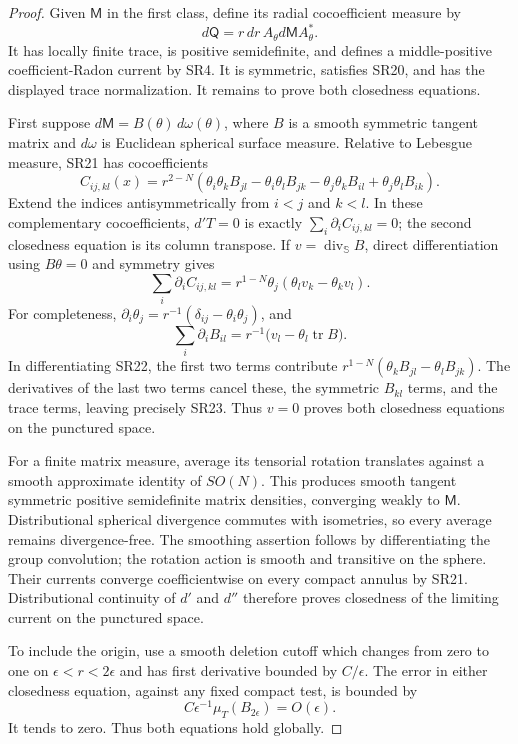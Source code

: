 \begin{proof}
Given $\mathsf M$ in the first class, define its radial
cocoefficient measure by
\[
           d\mathsf Q=r\,dr\,A_\theta d\mathsf M A_\theta^*.
 \tag{SR21}
\]
It has locally finite trace, is positive semidefinite,
and defines a middle-positive coefficient-Radon current
by SR4.  It is symmetric, satisfies SR20, and has the
displayed trace normalization.  It remains to prove both
closedness equations.

First suppose $d\mathsf M=B(\theta)\,d\omega(\theta)$,
where $B$ is a smooth symmetric tangent matrix and $d\omega$
is Euclidean spherical surface measure.  Relative to
Lebesgue measure, SR21 has cocoefficients
\[
 C_{ij,kl}(x)=r^{2-N}
  (\theta_i\theta_kB_{jl}-\theta_i\theta_lB_{jk}
          -\theta_j\theta_kB_{il}+\theta_j\theta_lB_{ik}).
 \tag{SR22}
\]
Extend the indices antisymmetrically from $i<j$ and $k<l$.
In these complementary cocoefficients, $d'T=0$ is exactly
$\sum_i\partial_i C_{ij,kl}=0$; the second closedness
equation is its column transpose.  If
$v=\operatorname{div}_{\mathbb S}B$, direct differentiation
using $B\theta=0$ and symmetry gives
\[
 \sum_i\partial_i C_{ij,kl}
       =r^{1-N}\theta_j(\theta_l v_k-\theta_k v_l).
 \tag{SR23}
\]
For completeness,
$\partial_i\theta_j=r^{-1}(\delta_{ij}-\theta_i\theta_j)$,
and
\[
 \sum_i\partial_i B_{il}
        =r^{-1}\bigl(v_l-\theta_l\operatorname{tr}B\bigr).
\]
In differentiating SR22, the first two terms contribute
$r^{1-N}(\theta_k B_{jl}-\theta_l B_{jk})$.
The derivatives of the last two terms cancel these,
the symmetric $B_{kl}$ terms, and the trace terms,
leaving precisely SR23.  Thus $v=0$ proves both
closedness equations on the punctured space.

For a finite matrix measure, average its tensorial rotation
translates against a smooth approximate identity of $SO(N)$.
This produces smooth tangent symmetric positive semidefinite
matrix densities, converging weakly to $\mathsf M$.
Distributional spherical divergence commutes with isometries,
so every average remains divergence-free.  The smoothing
assertion follows by differentiating the group convolution;
the rotation action is smooth and transitive on the sphere.
Their currents converge coefficientwise on every compact
annulus by SR21.  Distributional continuity of $d'$ and
$d''$ therefore proves closedness of the limiting current
on the punctured space.

To include the origin, use a smooth deletion cutoff which
changes from zero to one on $\epsilon<r<2\epsilon$ and
has first derivative bounded by $C/\epsilon$.  The error
in either closedness equation, against any fixed compact
test, is bounded by
\[
            C\epsilon^{-1}\mu_T(B_{2\epsilon})
                                     =O(\epsilon).
 \tag{SR24}
\]
It tends to zero.  Thus both equations hold globally.


\end{proof}
